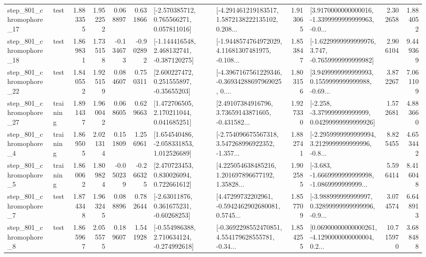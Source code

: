 \begin{tabular}{llrrrrllrlrr}
  step\_801\_chromophore\_17 &      test &      1.883355 &    1.952252 &      0.068897 &  0.631866 &    [-2.570385712, 0.765566271, 0.057811016] &  [-4.291461219183517, 1.5872138222135102, 0.208... &       1.913065 &  [3.9170000000000016, -1.3399999999999963, -0.0... &            2.302658 &          1.884052 \\
  step\_801\_chromophore\_18 &      test &      1.869831 &    1.735158 &     -0.134673 & -0.902892 &   [-1.144416548, 2.468132741, -0.387120275] &  [-1.9448574764972029, 4.11681307481975, -0.108... &       1.853847 &  [-1.6229999999999976, 3.747, -0.7659999999999982] &            2.906104 &          9.449369 \\
  step\_801\_chromophore\_22 &      test &      1.840552 &    1.925159 &      0.084607 &  0.750311 &     [2.600227472, 0.251555897, -0.35655203] &  [-4.3967167561229346, -0.36934288697969025, 0.... &       1.803156 &  [3.9499999999999993, 0.1559999999999988, -0.69... &            3.872267 &          7.061109 \\
  step\_801\_chromophore\_27 &  training &      1.891437 &    1.960042 &      0.068605 &  0.629663 &     [1.472706505, 2.170211044, 0.041685251] &  [2.49107384916796, 3.73659143871605, -0.431582... &       1.927330 &  [-2.258, -3.379999999999999, 0.04299999999999926] &            1.572681 &          4.883660 \\
   step\_801\_chromophore\_4 &  training &      1.869505 &    2.021314 &      0.151809 &  1.256961 &    [1.654540486, -2.058331853, 1.012526689] &  [-2.754096675567318, 3.547268996922352, -1.357... &       1.882741 &  [-2.2959999999999994, 3.2129999999999996, -0.8... &            8.825455 &          4.653442 \\
   step\_801\_chromophore\_5 &  training &      1.860062 &    1.809824 &     -0.050239 & -0.266325 &     [2.470723453, 0.830026094, 0.722661612] &  [4.225054638485216, 1.201697896677192, 1.35828... &       1.902585 &  [-3.683, -1.6669999999999998, -1.0869999999999... &            5.596414 &          8.416048 \\
   step\_801\_chromophore\_7 &      test &      1.874348 &    1.963245 &      0.088896 &  0.782644 &     [-2.63011876, 0.361675231, -0.60268253] &  [4.47299732202961, -0.5942462902680081, 0.5745... &       1.857709 &  [-3.988999999999997, 0.32899999999999996, -0.9... &            3.074574 &          6.648913 \\
   step\_801\_chromophore\_8 &      test &      1.865967 &    2.055575 &      0.189607 &  1.541928 &   [-0.554986388, 2.710634124, -0.274992618] &  [-0.3692298552470851, 4.554179628555781, -0.34... &       1.854255 &  [0.06900000000000261, -4.1290000000000004, 0.2... &           10.715970 &          3.688488 \\

\end{tabular}

